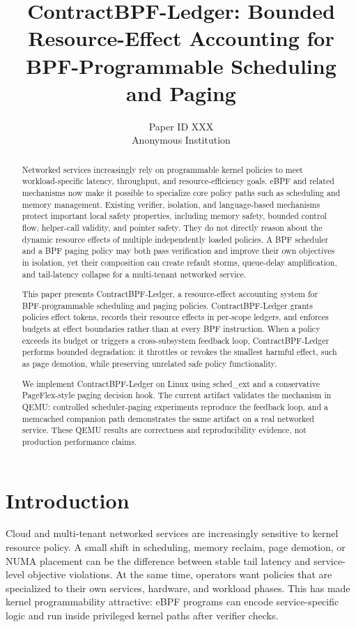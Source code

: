 \documentclass[letterpaper,twocolumn,10pt]{article}
\title{\bf ContractBPF-Ledger: Bounded Resource-Effect Accounting for BPF-Programmable Scheduling and Paging}
\author{Paper ID XXX\\Anonymous Institution}
\date{}
\newcommand{\sys}{ContractBPF-Ledger\xspace}
\begin{document}
\maketitle

\begin{abstract}
Networked services increasingly rely on programmable kernel policies to meet workload-specific latency, throughput, and resource-efficiency goals. eBPF and related mechanisms now make it possible to specialize core policy paths such as scheduling and memory management. Existing verifier, isolation, and language-based mechanisms protect important local safety properties, including memory safety, bounded control flow, helper-call validity, and pointer safety. They do not directly reason about the dynamic resource effects of multiple independently loaded policies. A BPF scheduler and a BPF paging policy may both pass verification and improve their own objectives in isolation, yet their composition can create refault storms, queue-delay amplification, and tail-latency collapse for a multi-tenant networked service.

This paper presents \sys, a resource-effect accounting system for BPF-programmable scheduling and paging policies. \sys grants policies effect tokens, records their resource effects in per-scope ledgers, and enforces budgets at effect boundaries rather than at every BPF instruction. When a policy exceeds its budget or triggers a cross-subsystem feedback loop, \sys performs bounded degradation: it throttles or revokes the smallest harmful effect, such as page demotion, while preserving unrelated safe policy functionality.

We implement \sys on Linux using sched\_ext and a conservative PageFlex-style paging decision hook. The current artifact validates the mechanism in QEMU: controlled scheduler-paging experiments reproduce the feedback loop, and a memcached companion path demonstrates the same artifact on a real networked service. These QEMU results are correctness and reproducibility evidence, not production performance claims.
\end{abstract}

\section{Introduction}

Cloud and multi-tenant networked services are increasingly sensitive to kernel resource policy. A small shift in scheduling, memory reclaim, page demotion, or NUMA placement can be the difference between stable tail latency and service-level objective violations. At the same time, operators want policies that are specialized to their own services, hardware, and workload phases. This has made kernel programmability attractive: eBPF programs can encode service-specific logic and run inside privileged kernel paths after verifier checks.
\end{document}
